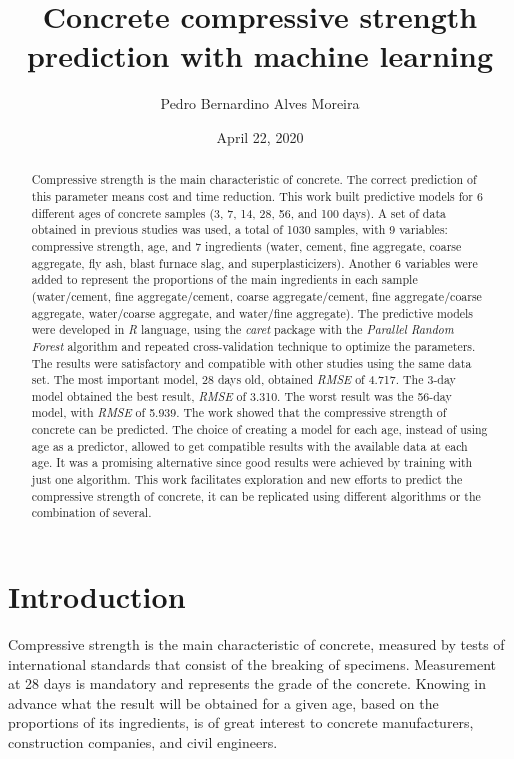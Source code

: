\documentclass[]{article}
\title{Concrete compressive strength prediction with machine learning}
\author{Pedro Bernardino Alves Moreira}
\date{April 22, 2020}
\begin{document}
\maketitle
\begin{abstract}
Compressive strength is the main characteristic of concrete. The correct
prediction of this parameter means cost and time reduction. This work
built predictive models for 6 different ages of concrete samples (3, 7,
14, 28, 56, and 100 days). A set of data obtained in previous studies
was used, a total of 1030 samples, with 9 variables: compressive
strength, age, and 7 ingredients (water, cement, fine aggregate, coarse
aggregate, fly ash, blast furnace slag, and superplasticizers). Another
6 variables were added to represent the proportions of the main
ingredients in each sample (water/cement, fine aggregate/cement, coarse
aggregate/cement, fine aggregate/coarse aggregate, water/coarse
aggregate, and water/fine aggregate). The predictive models were
developed in \emph{R} language, using the \emph{caret} package with the
\emph{Parallel Random Forest} algorithm and repeated cross-validation
technique to optimize the parameters. The results were satisfactory and
compatible with other studies using the same data set. The most
important model, 28 days old, obtained \emph{RMSE} of 4.717. The 3-day
model obtained the best result, \emph{RMSE} of 3.310. The worst result
was the 56-day model, with \emph{RMSE} of 5.939. The work showed that
the compressive strength of concrete can be predicted. The choice of
creating a model for each age, instead of using age as a predictor,
allowed to get compatible results with the available data at each age.
It was a promising alternative since good results were achieved by
training with just one algorithm. This work facilitates exploration and
new efforts to predict the compressive strength of concrete, it can be
replicated using different algorithms or the combination of several.
\end{abstract}

\newpage
\tableofcontents
\newpage
\listoffigures
\listoftables
\newpage

\hypertarget{introduction}{%
\section{Introduction}\label{introduction}}

Compressive strength is the main characteristic of concrete, measured by
tests of international standards that consist of the breaking of
specimens. Measurement at 28 days is mandatory and represents the grade
of the concrete. Knowing in advance what the result will be obtained for
a given age, based on the proportions of its ingredients, is of great
interest to concrete manufacturers, construction companies, and civil
engineers.
\end{document}
